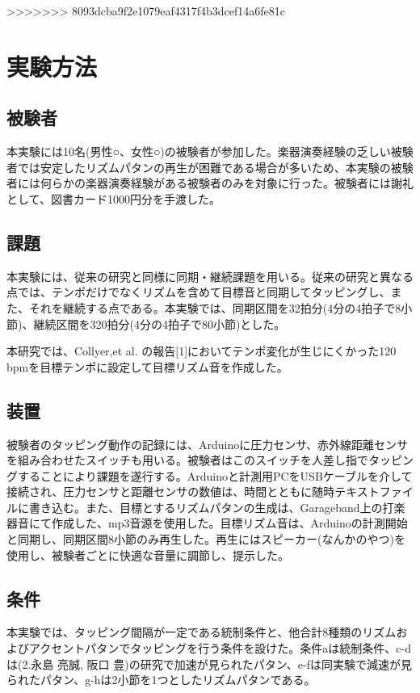 \documentclass[twocolumn,10pt]{jarticle}
\begin{document}
>>>>>>> 8093dcba9f2e1079eaf4317f4b3dcef14a6fe81c
\section{実験方法}
\subsection{被験者}
本実験には10名(男性○、女性○)の被験者が参加した。楽器演奏経験の乏しい被験者では安定したリズムパタンの再生が困難である場合が多いため、本実験の被験者には何らかの楽器演奏経験がある被験者のみを対象に行った。被験者には謝礼として、図書カード1000円分を手渡した。

\subsection{課題}
本実験には、従来の研究と同様に同期・継続課題を用いる。従来の研究と異なる点では、テンポだけでなくリズムを含めて目標音と同期してタッピングし、また、それを継続する点である。本実験では、同期区間を32拍分(4分の4拍子で8小節)、継続区間を320拍分(4分の4拍子で80小節)とした。

本研究では、Collyer,et al. の報告[1]においてテンポ変化が生じにくかった120 bpmを目標テンポに設定して目標リズム音を作成した。

\subsection{装置}
被験者のタッピング動作の記録には、Arduinoに圧力センサ、赤外線距離センサを組み合わせたスイッチも用いる。被験者はこのスイッチを人差し指でタッピングすることにより課題を遂行する。Arduinoと計測用PCをUSBケーブルを介して接続され、圧力センサと距離センサの数値は、時間とともに随時テキストファイルに書き込む。また、目標とするリズムパタンの生成は、Garageband上の打楽器音にて作成した、mp3音源を使用した。目標リズム音は、Arduinoの計測開始と同期し、同期区間8小節のみ再生した。再生にはスピーカー(なんかのやつ)を使用し、被験者ごとに快適な音量に調節し、提示した。

\subsection{条件}
本実験では、タッピング間隔が一定である統制条件と、他合計8種類のリズムおよびアクセントパタンでタッピングを行う条件を設けた。条件aは統制条件、c-dは(2.永島 亮誠, 阪口 豊)の研究で加速が見られたパタン、e-fは同実験で減速が見られたパタン、g-hは2小節を1つとしたリズムパタンである。
\end{document}
